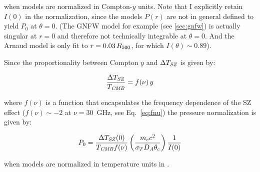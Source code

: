 when models are normalized in Compton-$y$ units.  Note that I
explicitly retain $I(0)$ in the normalization, since the models $P(r)$
are not in general defined to yield $P_0$ at $\theta = 0$.  (The GNFW
model for example (see \ref{sec:gnfw}) is actually singular at $r=0$
and therefore not technically integrable at $\theta = 0$.  And the
Arnaud model is only fit to $r = 0.03\,\R500$, for which $I(\theta)
\sim 0.89$).

Since the proportionality between Compton $y$ and $\Delta T_{\it SZ}$ is given by:

\begin{equation}
{{\Delta T_{\it SZ}}\over{T_{\it CMB}}} = f(\nu)\,y
\label{eq:ynu}
\end{equation}

where $f(\nu)$ is a function that encapsulates the frequency
dependence of the SZ effect ($f(\nu) \sim -2$ at $\nu = 30$~GHz, see
Eq.~\ref{eq:fnu}) the pressure normalization is given by:

\begin{equation}
P_0 = {{\Delta T_{\it SZ}(0)}\over{T_{\it CMB}f(\nu)}}\left({{m_e c^2}\over{\sigma_T D_A\theta_c}}\right){1\over{I(0)}}
\end{equation}

when models are normalized in temperature units in \climax.

